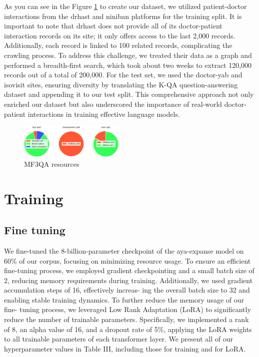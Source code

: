 \documentclass[conference]{IEEEtran}
\begin{document}
	As you can see in the Figure
	\ref{fig2}
	to create our dataset, we utilized patient-doctor interactions from the drhast and niniban platforms for the training split. It is important to note that drhast does not provide all of its doctor-patient interaction records on its site; it only offers access to the last 2,000 records. Additionally, each record is linked to 100 related records, complicating the crawling process. To address this challenge, we treated their data as a graph and performed a breadth-first search, which took about two weeks to extract 120,000 records out of a total of 200,000. For the test set, we used the doctor-yab and isovisit sites, ensuring diversity by translating the K-QA question-answering dataset
	\cite{b26}
	and appending it to our test split. This comprehensive approach not only enriched our dataset but also underscored the importance of real-world doctor-patient interactions in training effective language models.
	
	\begin{figure}[htbp]
		\centerline{\includegraphics[width=0.45\textwidth]{fig2.png}}
		\caption{MF3QA resources}
		\label{fig2}
	\end{figure}
	
	\section{Training}
	\subsection{Fine tuning}
	We fine-tuned the 8-billion-parameter checkpoint of the aya-expanse model on 60\% of our corpus, focusing on minimizing
	resource usage. To ensure an efficient fine-tuning process, we
	employed gradient checkpointing and a small batch size of 2,
	reducing memory requirements during training. Additionally,
	we used gradient accumulation steps of 16, effectively increas-
	ing the overall batch size to 32 and enabling stable training
	dynamics. To further reduce the memory usage of our fine-
	tuning process, we leveraged Low Rank Adaptation (LoRA)
	\cite{b27}
	to significantly reduce the number of trainable parameters.
	Specifically, we implemented a rank of 8, an alpha value of
	16, and a dropout rate of 5\%, applying the LoRA weights to
	all trainable parameters of each transformer layer. We present
	all of our hyperparameter values in Table III, including those
	for training and for LoRA.
	
\end{document}
